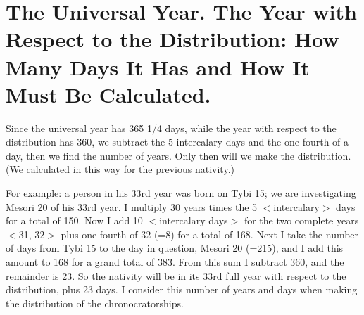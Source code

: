 \section{The Universal Year. The Year with Respect to the Distribution: How Many Days It Has and How It Must Be Calculated.}

Since the universal year has 365 1/4 days, while the year with respect to the distribution has 360, we subtract the 5 intercalary days and the one-fourth of a day, then we find the number of years. Only then will we make the distribution. (We calculated in this way for the previous nativity.) 

For example: a person in his 33rd year was born on Tybi 15; we are investigating Mesori 20 of his 33rd year. I multiply 30 years
times the 5 $<$intercalary$>$ days for a total of 150. Now I add 10 $<$intercalary days$>$ for the two complete years $<$31, 32$>$ plus one-fourth of 32 (=8) for a total of 168. Next I take the number of days from Tybi 15 to the day in question, Mesori 20 (=215), and I add this amount to 168 for a grand total of 383. From this sum I subtract 360, and the remainder is 23. So the nativity will be in its 33rd full year with respect to the distribution, plus 23 days. I consider this number of years and days when making the distribution of the chronocratorships.

\newpage